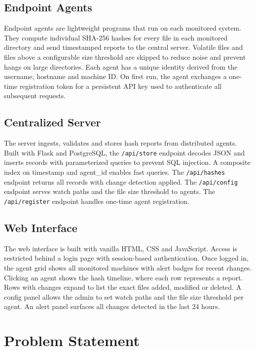 \documentclass[conference]{IEEEtran}
\begin{document}
\subsection{Endpoint Agents}

Endpoint agents are lightweight programs that run on each monitored system. They compute individual SHA-256 hashes for every file in each monitored directory and send timestamped reports to the central server. Volatile files and files above a configurable size threshold are skipped to reduce noise and prevent hangs on large directories. Each agent has a unique identity derived from the username, hostname and machine ID. On first run, the agent exchanges a one-time registration token for a persistent API key used to authenticate all subsequent requests.

\subsection{Centralized Server}

The server ingests, validates and stores hash reports from distributed agents. Built with Flask and PostgreSQL, the \texttt{/api/store} endpoint decodes JSON and inserts records with parameterized queries to prevent SQL injection. A composite index on timestamp and agent\_id enables fast queries. The \texttt{/api/hashes} endpoint returns all records with change detection applied. The \texttt{/api/config} endpoint serves watch paths and the file size threshold to agents. The \texttt{/api/register} endpoint handles one-time agent registration.

\subsection{Web Interface}

The web interface is built with vanilla HTML, CSS and JavaScript. Access is restricted behind a login page with session-based authentication. Once logged in, the agent grid shows all monitored machines with alert badges for recent changes. Clicking an agent shows the hash timeline, where each row represents a report. Rows with changes expand to list the exact files added, modified or deleted. A config panel allows the admin to set watch paths and the file size threshold per agent. An alert panel surfaces all changes detected in the last 24 hours.

\section{Problem Statement}
\end{document}

